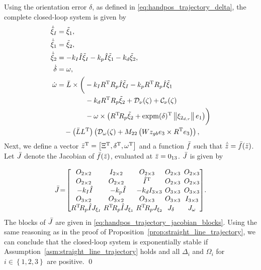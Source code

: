 

Using the orientation error $\delta$, as defined in \eqref{eq:handpos_trajectory_delta}, the complete closed-loop system is given by
\begin{subequations}
    \begin{align}
        \dot{\tilde{\xi}}_I &= \tilde{\xi}_1, \\
        \dot{\tilde{\xi}}_1 &= \tilde{\xi}_2, \\
        \dot{\tilde{\xi}}_2 &= -k_I \hat{I} \tilde{\xi}_I - k_p \hat{I} \tilde{\xi}_1 - k_d \tilde{\xi}_2, \\
        \dot{\delta} &= \omega, \\
        \dot{\omega} &= \Bar{L} \times \bigg(-k_I R^{\mathrm{T}} R_p \hat{I} \tilde{\xi}_I - k_p R^{\mathrm{T}} R_p \hat{I} \tilde{\xi}_1 \nonumber \\
        &\qquad \qquad - k_d R^{\mathrm{T}} R_p \tilde{\xi}_2 + \mathcal{D}_{\nu}(\zeta) + \mathcal{C}_{\nu}(\zeta) \nonumber \\
        &\qquad \qquad - \omega \times \left(R^{\mathrm{T}}\! R_p \tilde{\xi}_2 + {\rm expm}(\delta)^{\mathrm{T}} \left\|\xi_{2_{d,r}}\right\|e_1\right)\!\bigg) \nonumber \\
        &\quad - \left(\Bar{L}L^{\mathrm{T}}\right) \left(\mathcal{D}_{\omega}(\zeta) + M_{22}\left(Wz_{gb} e_3 \times R^{\mathrm{T}} e_3\right)\right),
    \end{align}
\end{subequations}
Next, we define a vector $\Bar{z}^{\mathrm{T}} = \left[\Xi^{\mathrm{T}}, \delta^{\mathrm{T}}, \omega^{\mathrm{T}}\right]$ and a function $\Bar{f}$ such that $\dot{\Bar{z}} = \Bar{f}(\Bar{z})$.
Let $\Bar{J}$ denote the Jacobian of $\Bar{f}(\Bar{z})$, evaluated at $\Bar{z} = 0_{13}$.
$\Bar{J}$ is given by

\begin{equation}
    \Bar{J} \!=\! \begin{bmatrix}
        O_{2 \times 2} & I_{2 \times 2} & O_{2 \times 3} & O_{2 \times 3}\!\!\! & O_{2 \times 3} \\
        O_{2 \times 2} & O_{2 \times 2} & \hat{I}\T & O_{2 \times 3}\!\!\! & O_{2 \times 3} \\
        -k_I \hat{I}\!\! & -k_p \hat{I}\!\!\! & -k_d I_{3 \times 3}\!\!\!\! & O_{3 \times 3}\!\!\! & O_{3 \times 3} \\
        O_{3 \times 2} & O_{3 \times 2} & O_{3 \times 3} & O_{3 \times 3}\!\!\! & I_{3 \times 3} \\
        R\T\! R_p \hat{I}J_{\xi_I}\!\!\!\! & R\T\! R_p \hat{I}J_{\xi_1}\!\!\!\! & R\T\! R_p J_{\xi_2}\!\!\!\! & J_{\delta} & J_{\omega}
    \end{bmatrix}\!. \label{eq:handpos_trajectory_jacobian}
\end{equation}
The blocks of $\Bar{J}$ are given in \eqref{eq:handpos_trajectory_jacobian_blocks}.
Using the same reasoning as in the proof of Proposition~\ref{prop:straight_line_trajectory}, we can conclude that the closed-loop system is exponentially stable if Assumption~\ref{asm:straight_line_trajectory} holds and all $\Delta_i$ and $\Omega_i$ for $i \in \left\{1,2,3\right\}$ are positive. \qed

